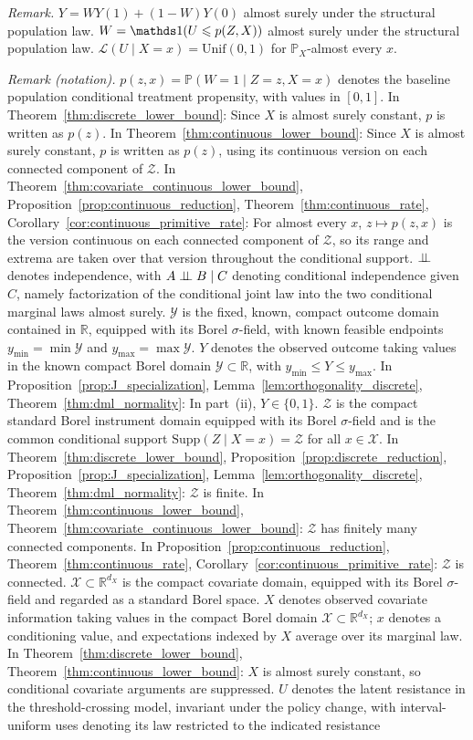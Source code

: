 \noindent\textit{Remark.} $Y=WY(1)+(1-W)Y(0)$ almost surely under the structural population law. $W=\indicator(U\leqslant p(Z,X))$ almost surely under the structural population law. $\mathcal L(U\mid X=x)=\mathrm{Unif}(0,1)$ for $\mathbb P_X$-almost every $x$.

\noindent\textit{Remark (notation).} $p(z,x)=\mathbb P(W=1\mid Z=z,X=x)$ denotes the baseline population conditional treatment propensity, with values in $[0,1]$. In Theorem~\ref{thm:discrete_lower_bound}: Since $X$ is almost surely constant, $p$ is written as $p(z)$. In Theorem~\ref{thm:continuous_lower_bound}: Since $X$ is almost surely constant, $p$ is written as $p(z)$, using its continuous version on each connected component of $\mathcal Z$. In Theorem~\ref{thm:covariate_continuous_lower_bound}, Proposition~\ref{prop:continuous_reduction}, Theorem~\ref{thm:continuous_rate}, Corollary~\ref{cor:continuous_primitive_rate}: For almost every $x$, $z\mapsto p(z,x)$ is the version continuous on each connected component of $\mathcal Z$, so its range and extrema are taken over that version throughout the conditional support. $\perp\!\!\!\perp$ denotes independence, with $A\perp\!\!\!\perp B\mid C$ denoting conditional independence given $C$, namely factorization of the conditional joint law into the two conditional marginal laws almost surely. $\mathcal Y$ is the fixed, known, compact outcome domain contained in $\mathbb R$, equipped with its Borel $\sigma$-field, with known feasible endpoints $y_{\min}=\min\mathcal Y$ and $y_{\max}=\max\mathcal Y$. $Y$ denotes the observed outcome taking values in the known compact Borel domain $\mathcal Y\subset\mathbb R$, with $y_{\min}\leqslant Y\leqslant y_{\max}$. In Proposition~\ref{prop:J_specialization}, Lemma~\ref{lem:orthogonality_discrete}, Theorem~\ref{thm:dml_normality}: In part~\textup{(ii)}, $Y\in\{0,1\}$. $\mathcal Z$ is the compact standard Borel instrument domain equipped with its Borel $\sigma$-field and is the common conditional support $\mathrm{Supp}(Z\mid X=x)=\mathcal Z$ for all $x\in\mathcal X$. In Theorem~\ref{thm:discrete_lower_bound}, Proposition~\ref{prop:discrete_reduction}, Proposition~\ref{prop:J_specialization}, Lemma~\ref{lem:orthogonality_discrete}, Theorem~\ref{thm:dml_normality}: $\mathcal Z$ is finite. In Theorem~\ref{thm:continuous_lower_bound}, Theorem~\ref{thm:covariate_continuous_lower_bound}: $\mathcal Z$ has finitely many connected components. In Proposition~\ref{prop:continuous_reduction}, Theorem~\ref{thm:continuous_rate}, Corollary~\ref{cor:continuous_primitive_rate}: $\mathcal Z$ is connected. $\mathcal X\subset\mathbb R^{d_X}$ is the compact covariate domain, equipped with its Borel $\sigma$-field and regarded as a standard Borel space. $X$ denotes observed covariate information taking values in the compact Borel domain $\mathcal X\subset\mathbb R^{d_X}$; $x$ denotes a conditioning value, and expectations indexed by $X$ average over its marginal law. In Theorem~\ref{thm:discrete_lower_bound}, Theorem~\ref{thm:continuous_lower_bound}: $X$ is almost surely constant, so conditional covariate arguments are suppressed. $U$ denotes the latent resistance in the threshold-crossing model, invariant under the policy change, with interval-uniform uses denoting its law restricted to the indicated resistance 